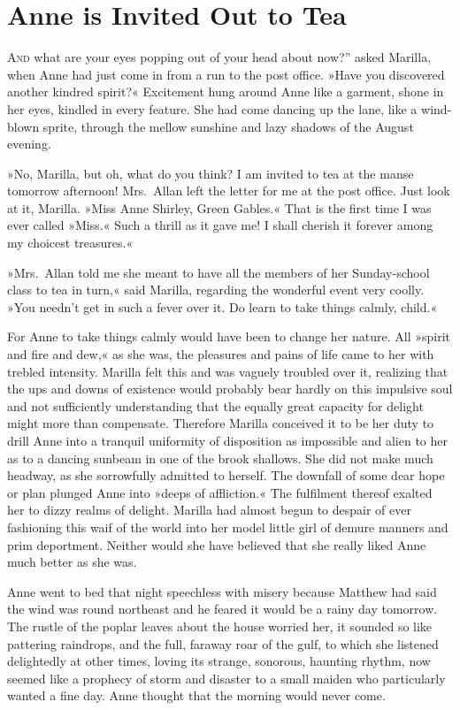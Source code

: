 \chapter{Anne is Invited Out to Tea}

\lettrine[ante=“,lines=4]{A}{nd} what are your eyes popping out of your head about now?” asked Marilla, when Anne had just come in from a run to the post office. »Have you discovered another kindred spirit?« Excitement hung around Anne like a garment, shone in her eyes, kindled in every feature. She had come dancing up the lane, like a wind-blown sprite, through the mellow sunshine and lazy shadows of the August evening.

»No, Marilla, but oh, what do you think? I am invited to tea at the manse tomorrow afternoon! Mrs.~Allan left the letter for me at the post office. Just look at it, Marilla. »Miss Anne Shirley, Green Gables.« That is the first time I was ever called »Miss.« Such a thrill as it gave me! I shall cherish it forever among my choicest treasures.«

»Mrs.~Allan told me she meant to have all the members of her Sunday-school class to tea in turn,« said Marilla, regarding the wonderful event very coolly. »You needn't get in such a fever over it. Do learn to take things calmly, child.«

For Anne to take things calmly would have been to change her nature. All »spirit and fire and dew,« as she was, the pleasures and pains of life came to her with trebled intensity. Marilla felt this and was vaguely troubled over it, realizing that the ups and downs of existence would probably bear hardly on this impulsive soul and not sufficiently understanding that the equally great capacity for delight might more than compensate. Therefore Marilla conceived it to be her duty to drill Anne into a tranquil uniformity of disposition as impossible and alien to her as to a dancing sunbeam in one of the brook shallows. She did not make much headway, as she sorrowfully admitted to herself. The downfall of some dear hope or plan plunged Anne into »deeps of affliction.« The fulfilment thereof exalted her to dizzy realms of delight. Marilla had almost begun to despair of ever fashioning this waif of the world into her model little girl of demure manners and prim deportment. Neither would she have believed that she really liked Anne much better as she was.

Anne went to bed that night speechless with misery because Matthew had said the wind was round northeast and he feared it would be a rainy day tomorrow. The rustle of the poplar leaves about the house worried her, it sounded so like pattering raindrops, and the full, faraway roar of the gulf, to which she listened delightedly at other times, loving its strange, sonorous, haunting rhythm, now seemed like a prophecy of storm and disaster to a small maiden who particularly wanted a fine day. Anne thought that the morning would never come.


